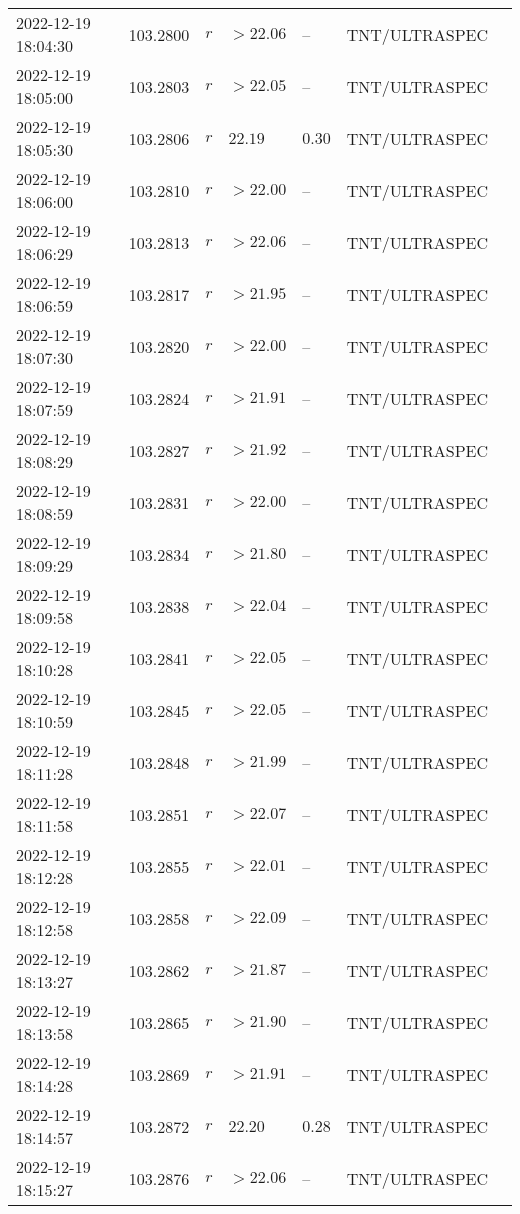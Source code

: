 \documentclass{nature_plusfigure}
\begin{document}
\begin{supplement}
\begin{center}
\begin{longtable}{lllllll}
2022-12-19 18:04:30 & 103.2800 & $r$ & $>22.06$ & -- & TNT/ULTRASPEC &  \\ 
2022-12-19 18:05:00 & 103.2803 & $r$ & $>22.05$ & -- & TNT/ULTRASPEC &  \\ 
2022-12-19 18:05:30 & 103.2806 & $r$ & $22.19$ & $0.30$ & TNT/ULTRASPEC &  \\ 
2022-12-19 18:06:00 & 103.2810 & $r$ & $>22.00$ & -- & TNT/ULTRASPEC &  \\ 
2022-12-19 18:06:29 & 103.2813 & $r$ & $>22.06$ & -- & TNT/ULTRASPEC &  \\ 
2022-12-19 18:06:59 & 103.2817 & $r$ & $>21.95$ & -- & TNT/ULTRASPEC &  \\ 
2022-12-19 18:07:30 & 103.2820 & $r$ & $>22.00$ & -- & TNT/ULTRASPEC &  \\ 
2022-12-19 18:07:59 & 103.2824 & $r$ & $>21.91$ & -- & TNT/ULTRASPEC &  \\ 
2022-12-19 18:08:29 & 103.2827 & $r$ & $>21.92$ & -- & TNT/ULTRASPEC &  \\ 
2022-12-19 18:08:59 & 103.2831 & $r$ & $>22.00$ & -- & TNT/ULTRASPEC &  \\ 
2022-12-19 18:09:29 & 103.2834 & $r$ & $>21.80$ & -- & TNT/ULTRASPEC &  \\ 
2022-12-19 18:09:58 & 103.2838 & $r$ & $>22.04$ & -- & TNT/ULTRASPEC &  \\ 
2022-12-19 18:10:28 & 103.2841 & $r$ & $>22.05$ & -- & TNT/ULTRASPEC &  \\ 
2022-12-19 18:10:59 & 103.2845 & $r$ & $>22.05$ & -- & TNT/ULTRASPEC &  \\ 
2022-12-19 18:11:28 & 103.2848 & $r$ & $>21.99$ & -- & TNT/ULTRASPEC &  \\ 
2022-12-19 18:11:58 & 103.2851 & $r$ & $>22.07$ & -- & TNT/ULTRASPEC &  \\ 
2022-12-19 18:12:28 & 103.2855 & $r$ & $>22.01$ & -- & TNT/ULTRASPEC &  \\ 
2022-12-19 18:12:58 & 103.2858 & $r$ & $>22.09$ & -- & TNT/ULTRASPEC &  \\ 
2022-12-19 18:13:27 & 103.2862 & $r$ & $>21.87$ & -- & TNT/ULTRASPEC &  \\ 
2022-12-19 18:13:58 & 103.2865 & $r$ & $>21.90$ & -- & TNT/ULTRASPEC &  \\ 
2022-12-19 18:14:28 & 103.2869 & $r$ & $>21.91$ & -- & TNT/ULTRASPEC &  \\ 
2022-12-19 18:14:57 & 103.2872 & $r$ & $22.20$ & $0.28$ & TNT/ULTRASPEC &  \\ 
2022-12-19 18:15:27 & 103.2876 & $r$ & $>22.06$ & -- & TNT/ULTRASPEC &  \\ 

\end{longtable}
\end{center}
\end{supplement}
\end{document}
